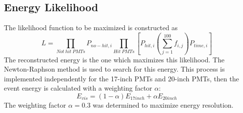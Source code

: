 \subsection*{Energy Likelihood}
The likelihood function to be maximized is constructed as 
\begin{equation}
	L=\prod_{Not\ hit\ PMTs}P_{no-hit,i}\prod_{Hit\ PMTs}\left[P_{hit,i}\left(\sum_{j=1}^{100}f_{i,j}\right)P_{time, i}\right]
	\label{eq:energy_likelihood}
\end{equation}
The reconstructed energy is the one which maximizes this likelihood. The Newton-Raphson method is used to search for this energy. This process is implemented independently for the 17-inch PMTs and 20-inch PMTs, then the event energy is calculated with a weighting factor $\alpha$:
\begin{equation}
	E_{vis}=(1-\alpha)E_{17inch}+\alpha E_{20inch}
\end{equation}
The weighting factor $\alpha=0.3$ was determined to maximize energy resolution.

